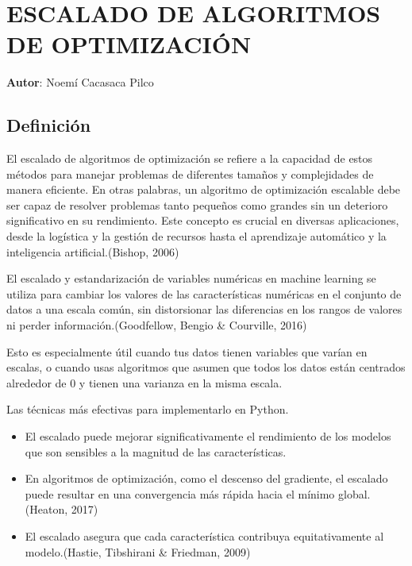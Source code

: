 

    \chapter{ESCALADO DE ALGORITMOS DE OPTIMIZACIÓN}
    \textbf{Autor}: \large{Noemí Cacasaca Pilco}
    \label{chap:12}
	
	\section{Definición}
	
	El escalado de algoritmos de optimización se refiere a la capacidad de estos métodos para manejar problemas de diferentes tamaños y complejidades de manera eficiente. En otras palabras, un algoritmo de optimización escalable debe ser capaz de resolver problemas tanto pequeños como grandes sin un deterioro significativo en su rendimiento. Este concepto es crucial en diversas aplicaciones, desde la logística y la gestión de recursos hasta el aprendizaje automático y la inteligencia artificial.(Bishop, 2006) 
	
	El escalado y estandarización de variables numéricas en machine learning se utiliza para cambiar los valores de las características numéricas en el conjunto de datos a una escala común, sin distorsionar las diferencias en los rangos de valores ni perder información.(Goodfellow, Bengio \& Courville, 2016) 
	
	Esto es especialmente útil cuando tus datos tienen variables que varían en escalas, o cuando usas algoritmos que asumen que todos los datos están centrados alrededor de 0 y tienen una varianza en la misma escala.
	
	Las técnicas más efectivas para implementarlo en Python.
	
	\begin{itemize}
		\item El escalado puede mejorar significativamente el rendimiento de los modelos que son sensibles a la magnitud de las características.
		\item En algoritmos de optimización, como el descenso del gradiente, el escalado puede resultar en una convergencia más rápida hacia el mínimo global.(Heaton, 2017) 
		\item El escalado asegura que cada característica contribuya equitativamente al modelo.(Hastie, Tibshirani \& Friedman, 2009) 
	\end{itemize}
	
